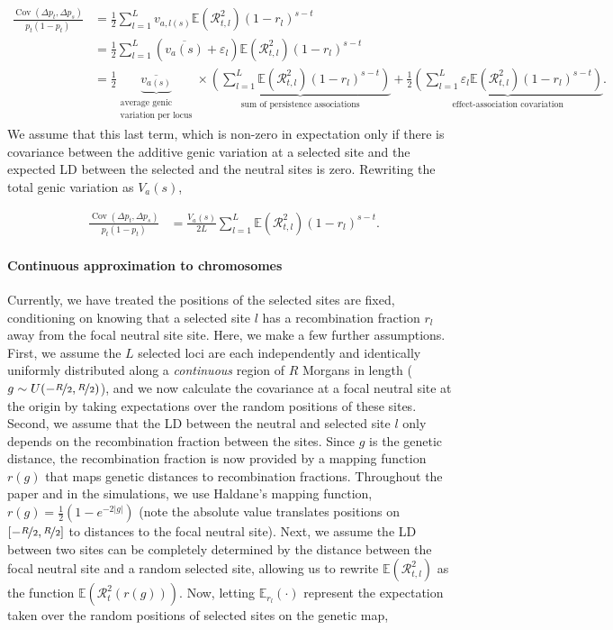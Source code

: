 \documentclass[11pt]{article}
\newcommand{\E}{\mathbb{E}}
\DeclareMathOperator{\cov}{Cov}
\begin{document}
\begin{align}
  \frac{\cov(\Delta p_t, \Delta p_s)}{p_t(1-p_t) } &= \frac{1}{2} \sum_{l=1}^L v_{a,l(s)} \E(\mathcal{R}_{t,l}^2) (1-r_l)^{s-t}  \nonumber \\
                                                   &= \frac{1}{2} \sum_{l=1}^L (\overline{v_a(s)} + \varepsilon_l) \E(\mathcal{R}_{t,l}^2) (1-r_l)^{s-t} \nonumber  \\
                                                   &= \frac{1}{2}\underbrace{\overline{v_{a(s)}}}_{\substack{\text{average genic}\\ \text{variation per locus}}} \times \underbrace{\left(\sum_{l=1}^L \E(\mathcal{R}_{t,l}^2) (1-r_l)^{s-t}\right)}_\text{sum of persistence associations}  + \frac{1}{2} \underbrace{\left(\sum_{l=1}^L \varepsilon_l \E(\mathcal{R}_{t,l}^2) (1-r_l)^{s-t}\right)}_\text{effect-association covariation}.
\end{align}
%
We assume that this last term, which is non-zero in expectation only if there
is covariance between the additive genic variation at a selected site and the
expected LD between the selected and the neutral sites is zero. Rewriting the
total genic variation as $V_a(s)$,

\begin{align}
  \frac{\cov(\Delta p_t, \Delta p_s)}{p_t(1-p_t)} &= \frac{V_a(s)}{2L} \sum_{l=1}^L \E(\mathcal{R}_{t,l}^2) (1-r_l)^{s-t}.
\end{align}

\paragraph{Continuous approximation to chromosomes}
\label{ap:ml-cont}

Currently, we have treated the positions of the selected sites are fixed,
conditioning on knowing that a selected site $l$ has a recombination fraction
$r_l$ away from the focal neutral site site. Here, we make a few further
assumptions. First, we assume the $L$ selected loci are each independently and
identically uniformly distributed along a \emph{continuous} region of $R$
Morgans in length ($g \sim U(-\nicefrac{R}{2}, \nicefrac{R}{2})$), and we now
calculate the covariance at a focal neutral site at the origin by taking
expectations over the random positions of these sites. Second, we assume that
the LD between the neutral and selected site $l$ only depends on the
recombination fraction between the sites. Since $g$ is the genetic distance,
the recombination fraction is now provided by a mapping function $r(g)$ that
maps genetic distances to recombination fractions.  Throughout the paper and in
the simulations, we use Haldane's mapping function, $r(g) = \frac{1}{2} (1 -
e^{-2|g|})$ (note the absolute value translates positions on
$[-\nicefrac{R}{2}, \nicefrac{R}{2}]$ to distances to the focal neutral site).
Next, we assume the LD between two sites can be completely determined by the
distance between the focal neutral site and a random selected site, allowing us
to rewrite $\E(\mathcal{R}^2_{t,l})$ as the function
$\E(\mathcal{R}^2_t(r(g)))$. Now, letting $\E_{r_l}(\cdot)$ represent the
expectation taken over the random positions of selected sites on the genetic
map, 
\end{document}
